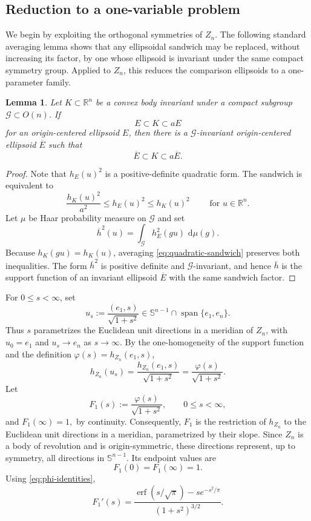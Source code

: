 \documentclass[11pt]{article}
\newtheorem{lemma}[theorem]{Lemma}
\theoremstyle{definition}
\theoremstyle{remark}
\newcommand{\R}{\mathbb R}
\newcommand{\Sph}{\mathbb S}
\newcommand{\dd}{\,\mathrm d}
\newcommand{\erf}{\operatorname{erf}}
\begin{document}
\subsection{Reduction to a one-variable problem}
We begin by exploiting the orthogonal symmetries of $Z_n$. The following standard averaging lemma shows that any ellipsoidal sandwich may be replaced, without increasing its factor, by one whose ellipsoid is invariant under the same compact symmetry group. Applied to $Z_n$, this reduces the comparison ellipsoids to a one-parameter family.

\begin{lemma}
\label{lem:ellipsoid-averaging}
Let $K\subset\R^n$ be a convex body invariant under a compact
subgroup $\mathcal G\subset O(n)$.  If
\[
 E\subset K\subset aE
\]
for an origin-centered ellipsoid $E$, then there is a
$\mathcal G$-invariant origin-centered ellipsoid $\overline E$ such
that
\[
 \overline E\subset K\subset a\overline E.
\]
\end{lemma}

\begin{proof}
Note that  $h_E(u)^2$ is a positive-definite quadratic
form.  The sandwich is equivalent to
\begin{equation}\label{eq:quadratic-sandwich}
 \frac{h_K(u)^2}{a^2}\leq h_E(u)^2\leq h_K(u)^2
 \qquad \mbox{ for } u\in\R^n.
\end{equation}
Let $\mu$ be Haar probability measure on $\mathcal G$ and set
\[
 \overline h^2(u)=\int_{\mathcal G}h_E^2(gu)\,\dd\mu(g).
\]
Because $h_K(gu)=h_K(u)$, averaging
\eqref{eq:quadratic-sandwich} preserves both inequalities.
The form $\overline h^2$ is positive definite and
$\mathcal G$-invariant, and hence $\overline h$ is the support function
of an invariant ellipsoid $\overline E$ with the same sandwich factor.
\end{proof}
For $0\leq s<\infty$, set
\[
 u_s:=\frac{(e_1,s)}{\sqrt{1+s^2}}
      \in \Sph^{n-1}\cap\operatorname{span}\{e_1,e_n\}.
\]
Thus $s$ parametrizes the Euclidean unit directions in a meridian of
$Z_n$, with $u_0=e_1$ and $u_s\to e_n$ as $s\to\infty$.  By the
one-homogeneity of the support function and the definition
$\varphi(s)=h_{Z_n}(e_1,s)$,
\[
 h_{Z_n}(u_s)
 =\frac{h_{Z_n}(e_1,s)}{\sqrt{1+s^2}}
 =\frac{\varphi(s)}{\sqrt{1+s^2}}.
\]
Let
\begin{equation}\label{eq:F1-definition}
 F_1(s):=\frac{\varphi(s)}{\sqrt{1+s^2}},
 \qquad 0\leq s<\infty,
\end{equation}
and $F_1(\infty)=1,$ by continuity. Consequently, $F_1$ is the restriction of $h_{Z_n}$ to the Euclidean
unit directions in a meridian, parametrized by their slope.  Since
$Z_n$ is a body of revolution and is origin-symmetric, these
directions represent, up to symmetry, all directions in $\Sph^{n-1}$.
Its endpoint values are 
\begin{equation}\label{eq:F1-endpoints}
 F_1(0)=F_1(\infty)=1.
\end{equation}
Using \eqref{eq:phi-identities},
\begin{equation}\label{eq:F1-derivative}
 F_1'(s)=
 \frac{\erf(s/\sqrt\pi)-se^{-s^2/\pi}}
 {(1+s^2)^{3/2}}.
\end{equation}
\end{document}
